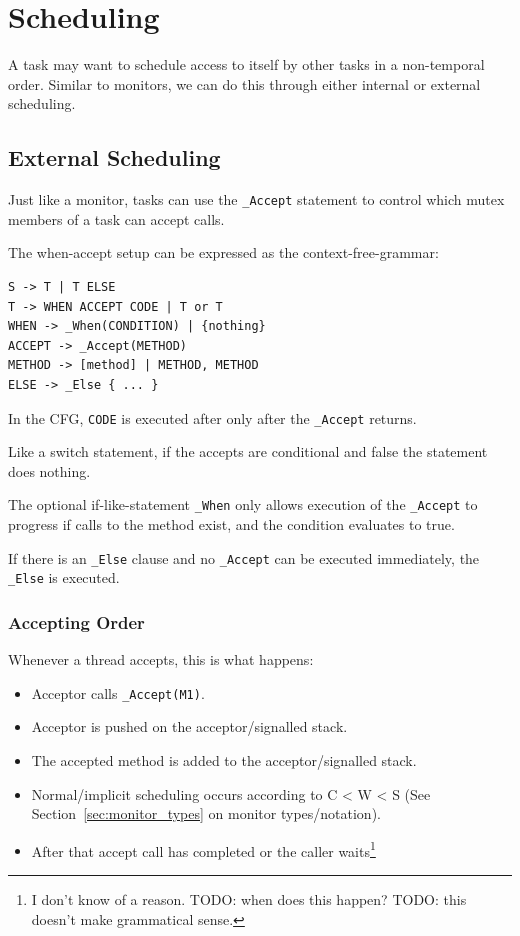         \section{Scheduling} %
        \label{sec:scheduling}
            A task may want to schedule access to itself by other tasks in a non-temporal order.
            Similar to monitors, we can do this through either internal or external scheduling.

            \subsection{External Scheduling} %
            \label{sub:external_scheduling}
                Just like a monitor, tasks can use the \verb|_Accept| statement to control which mutex members of a task can accept calls.

                The when-accept setup can be expressed as the context-free-grammar:
                \begin{verbatim}
S -> T | T ELSE
T -> WHEN ACCEPT CODE | T or T
WHEN -> _When(CONDITION) | {nothing}
ACCEPT -> _Accept(METHOD)
METHOD -> [method] | METHOD, METHOD
ELSE -> _Else { ... }
                \end{verbatim}
                In the CFG, \verb|CODE| is executed after only after the \verb|_Accept| returns.

                Like a switch statement, if the accepts are conditional and false the statement does nothing.

                The optional if-like-statement \verb|_When| only allows execution of the \verb|_Accept| to progress if calls to the method exist, and the condition evaluates to true.

                If there is an \verb|_Else| clause and no \verb|_Accept| can be executed immediately, the \verb|_Else| is executed.

                \subsubsection{Accepting Order} %
                \label{ssub:accepting_order}
                    Whenever a thread accepts, this is what happens:
                    \begin{itemize}
                        \item Acceptor calls \verb|_Accept(M1)|.
                        \item Acceptor is pushed on the acceptor/signalled stack.
                        \item The accepted method is added to the acceptor/signalled stack.
                        \item Normal/implicit scheduling occurs according to C < W < S (See Section~\ref{sec:monitor_types} on monitor types/notation).
                        \item After that accept call has completed or the caller waits\footnote{I don't know of a reason. TODO: when does this happen? TODO: this doesn't make grammatical sense.}
                    \end{itemize}
